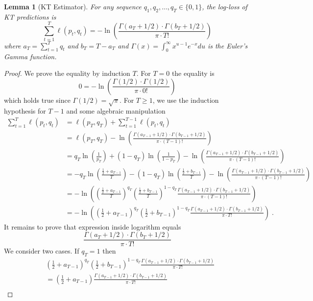 \documentclass{article}
\newtheorem{lemma}[theorem]{Lemma}
\begin{document}
\begin{lemma}[KT Estimator]
For any sequence $q_1, q_2, \dots, q_T \in \{0,1\}$, the log-loss of KT
predictions is
$$
\sum_{t=1}^T \ell(p_t, q_t) =  - \ln \left( \frac{\Gamma(a_T + 1/2) \cdot \Gamma(b_T + 1/2)}{\pi \cdot T!} \right)
$$
where $a_T = \sum_{t=1}^T q_t$ and $b_T = T - a_T$ and $\Gamma(x) =
\int_0^\infty x^{u-1} e^{-x} du$ is the Euler's Gamma function.
\end{lemma}

\begin{proof}
We prove the equality by induction $T$. For $T=0$ the equality is
$$
0 = - \ln \left( \frac{\Gamma(1/2) \cdot \Gamma(1/2)}{\pi \cdot 0!} \right)
$$
which holds true since $\Gamma(1/2) = \sqrt{\pi}$.
For $T \ge 1$, we use the induction hypothesis for $T-1$ and some algebraic manipulation
\begin{align*}
\sum_{t=1}^T \ell(p_t, q_t)
& = \ell(p_T, q_T) + \sum_{t=1}^{T-1} \ell(p_t, q_t) \\
& = \ell(p_T, q_T) - \ln \left( \frac{\Gamma(a_{T-1} + 1/2) \cdot \Gamma(b_{T-1} + 1/2)}{\pi \cdot (T-1)!} \right) \\
& = q_T \ln\left( \frac{1}{p_T}\right) + (1-q_T) \ln  \left( \frac{1}{1 - p_T} \right) - \ln \left( \frac{\Gamma(a_{T-1} + 1/2) \cdot \Gamma(b_{T-1} + 1/2)}{\pi \cdot (T-1)!} \right) \\
& = - q_T \ln\left( \frac{\frac{1}{2} + a_{T-1}}{T} \right) - (1-q_T) \ln\left( \frac{\frac{1}{2} + b_{T-1}}{T} \right) - \ln \left( \frac{\Gamma(a_{T-1} + 1/2) \cdot \Gamma(b_{T-1} + 1/2)}{\pi \cdot (T-1)!} \right) \\
& = - \ln\left( \left( \frac{\frac{1}{2} + a_{T-1}}{T} \right)^{q_T} \left( \frac{\frac{1}{2} + b_{T-1}}{T} \right)^{1-q_T} \frac{\Gamma(a_{T-1} + 1/2) \cdot \Gamma(b_{T-1} + 1/2)}{\pi \cdot (T-1)!} \right) \\
& = - \ln\left( \left( \frac{1}{2} + a_{T-1} \right)^{q_T} \left( \frac{1}{2} + b_{T-1} \right)^{1-q_T} \frac{\Gamma(a_{T-1} + 1/2) \cdot \Gamma(b_{T-1} + 1/2)}{\pi \cdot T!}  \right) \; .
\end{align*}
It remains to prove that expression inside logarithm equals
$$
\frac{\Gamma(a_{T} + 1/2) \cdot \Gamma(b_T + 1/2)}{\pi \cdot T!}
$$
We consider two cases. If $q_T = 1$ then
\begin{align*}
& \left( \frac{1}{2} + a_{T-1} \right)^{q_T} \left( \frac{1}{2} + b_{T-1} \right)^{1-q_T} \frac{\Gamma(a_{T-1} + 1/2) \cdot \Gamma(b_{T-1} + 1/2)}{\pi \cdot T!} \\
& = \left( \frac{1}{2} + a_{T-1} \right) \frac{\Gamma(a_{T-1} + 1/2) \cdot \Gamma(b_{T-1} + 1/2)}{\pi \cdot T!} \\

\end{align*}
\end{proof}
\end{document}
